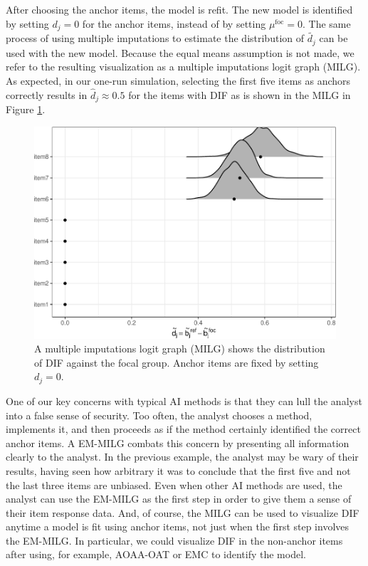 \documentclass[
  11pt,
]{article}
\begin{document}
After choosing the anchor items, the model is refit. The new model is identified by setting \(d_j = 0\) for the anchor items, instead of by setting \(\mu^\text{foc} = 0\). The same process of using multiple imputations to estimate the distribution of \(\tilde{d_j}\) can be used with the new model. Because the equal means assumption is not made, we refer to the resulting visualization as a multiple imputations logit graph (MILG). As expected, in our one-run simulation, selecting the first five items as anchors correctly results in \(\hat d_j \approx 0.5\) for the items with DIF as is shown in the MILG in Figure \ref{fig:milg}.

\begin{figure}[H]

{\centering \includegraphics[width=0.7\linewidth]{paper_files/figure-latex/milg-1} 

}

\caption{A multiple imputations logit graph (MILG) shows the distribution of DIF against the focal group. Anchor items are fixed by setting $d_j = 0$.}\label{fig:milg}
\end{figure}

One of our key concerns with typical AI methods is that they can lull the analyst into a false sense of security. Too often, the analyst chooses a method, implements it, and then proceeds as if the method certainly identified the correct anchor items. A EM-MILG combats this concern by presenting all information clearly to the analyst. In the previous example, the analyst may be wary of their results, having seen how arbitrary it was to conclude that the first five and not the last three items are unbiased. Even when other AI methods are used, the analyst can use the EM-MILG as the first step in order to give them a sense of their item response data. And, of course, the MILG can be used to visualize DIF anytime a model is fit using anchor items, not just when the first step involves the EM-MILG. In particular, we could visualize DIF in the non-anchor items after using, for example, AOAA-OAT or EMC to identify the model.
\end{document}
